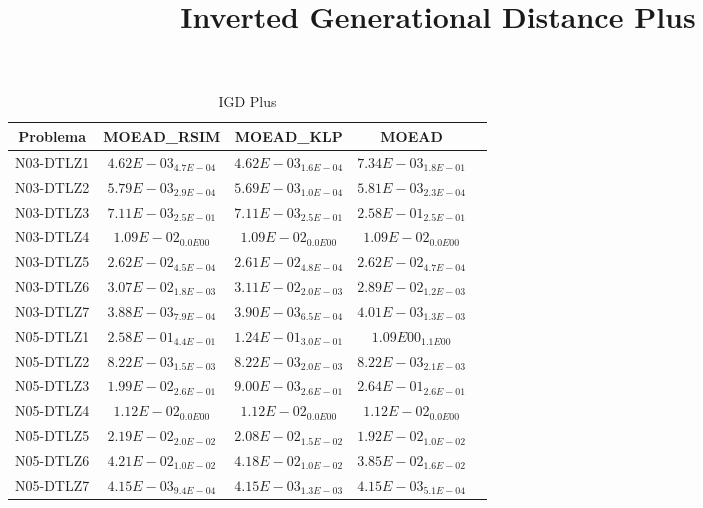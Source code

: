 \documentclass{article}
\title{Inverted Generational Distance Plus}
\author{}
\begin{document}
\maketitle
\begin{table*}[ht!]
\scriptsize
\caption{IGD Plus}
\centering\begin{tabular}{|c||c||c||c||c|} \hline
Problema &MOEAD_RSIM &MOEAD_KLP &MOEAD\\\hline
N03-DTLZ1 &\cellcolor{gray95}$4.62E-03_{4.7E-04}$ &\cellcolor{gray25}$4.62E-03_{1.6E-04}$ &$7.34E-03_{1.8E-01}$\\ 
\hline
N03-DTLZ2 &\cellcolor{gray25}$5.79E-03_{2.9E-04}$ &\cellcolor{gray95}$5.69E-03_{1.0E-04}$ &$5.81E-03_{2.3E-04}$\\ 
\hline
N03-DTLZ3 &\cellcolor{gray95}$7.11E-03_{2.5E-01}$ &\cellcolor{gray25}$7.11E-03_{2.5E-01}$ &$2.58E-01_{2.5E-01}$\\ 
\hline
N03-DTLZ4 &\cellcolor{gray95}$1.09E-02_{0.0E00}$ &\cellcolor{gray25}$1.09E-02_{0.0E00}$ &$1.09E-02_{0.0E00}$\\ 
\hline
N03-DTLZ5 &$2.62E-02_{4.5E-04}$ &\cellcolor{gray95}$2.61E-02_{4.8E-04}$ &\cellcolor{gray25}$2.62E-02_{4.7E-04}$\\ 
\hline
N03-DTLZ6 &\cellcolor{gray25}$3.07E-02_{1.8E-03}$ &$3.11E-02_{2.0E-03}$ &\cellcolor{gray95}$2.89E-02_{1.2E-03}$\\ 
\hline
N03-DTLZ7 &\cellcolor{gray95}$3.88E-03_{7.9E-04}$ &\cellcolor{gray25}$3.90E-03_{6.5E-04}$ &$4.01E-03_{1.3E-03}$\\ 
\hline
N05-DTLZ1 &\cellcolor{gray25}$2.58E-01_{4.4E-01}$ &\cellcolor{gray95}$1.24E-01_{3.0E-01}$ &$1.09E00_{1.1E00}$\\ 
\hline
N05-DTLZ2 &\cellcolor{gray95}$8.22E-03_{1.5E-03}$ &\cellcolor{gray25}$8.22E-03_{2.0E-03}$ &$8.22E-03_{2.1E-03}$\\ 
\hline
N05-DTLZ3 &\cellcolor{gray25}$1.99E-02_{2.6E-01}$ &\cellcolor{gray95}$9.00E-03_{2.6E-01}$ &$2.64E-01_{2.6E-01}$\\ 
\hline
N05-DTLZ4 &\cellcolor{gray95}$1.12E-02_{0.0E00}$ &\cellcolor{gray25}$1.12E-02_{0.0E00}$ &$1.12E-02_{0.0E00}$\\ 
\hline
N05-DTLZ5 &$2.19E-02_{2.0E-02}$ &\cellcolor{gray25}$2.08E-02_{1.5E-02}$ &\cellcolor{gray95}$1.92E-02_{1.0E-02}$\\ 
\hline
N05-DTLZ6 &$4.21E-02_{1.0E-02}$ &\cellcolor{gray25}$4.18E-02_{1.0E-02}$ &\cellcolor{gray95}$3.85E-02_{1.6E-02}$\\ 
\hline
N05-DTLZ7 &$4.15E-03_{9.4E-04}$ &\cellcolor{gray25}$4.15E-03_{1.3E-03}$ &\cellcolor{gray95}$4.15E-03_{5.1E-04}$\\ 

\end{tabular}
\end{table*}
\end{document}
